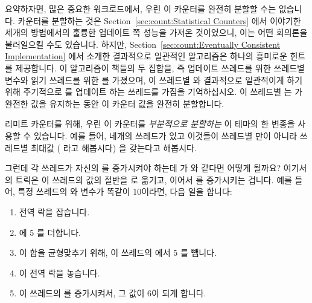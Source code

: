 \fi

요약하자면, 많은 중요한 워크로드에서, 우린 이 카운터를 완전히 분할할 수는
없습니다.
카운터를 분할하는 것은
Section~\ref{sec:count:Statistical Counters} 에서 이야기한 세개의 방법에서의
훌륭한 업데이트 쪽 성능을 가져온 것이었으니, 이는 어떤 회의론을 불러일으킬 수도
있습니다.
하지만,
Section~\ref{sec:count:Eventually Consistent Implementation}
에서 소개한 결과적으로 일관적인 알고리즘은 하나의 흥미로운 힌트를 제공합니다.
이 알고리즘이 책들의 두 집합을, 즉 업데이트 쓰레드를 위한 쓰레드별 
변수와 읽기 쓰레드를 위한  를 가졌으며, 이 쓰레드별
 와 결과적으로 일관적이게 하기 위해 주기적으로  를
업데이트 하는  쓰레드를 가짐을 기억하십시오.
이 쓰레드별  는  가 완전한 값을 유지하는 동안 이
카운터 값을 완전히 분할합니다.

리미트 카운터를 위해, 우린 이 카운터를 \emph{부분적으로 분할하는} 이 테마의 한
변종을 사용할 수 있습니다.
예를 들어, 네개의 쓰레드가 있고 이것들이 쓰레드별  만이 아니라
쓰레드별 최대값 ( 라고 해봅시다) 을 갖는다고 해봅시다.

그런데 각 쓰레드가 자신의  를 증가시켜야 하는데  가
 와 같다면 어떻게 될까요?
여기서의 트릭은 이 쓰레드의  값의 절반을  로
옮기고, 이어서  를 증가시키는 겁니다.
예를 들어, 특정 쓰레드의  와  변수가 똑같이
10이라면, 다음 일을 합니다:

\begin{enumerate}
\item	전역 락을 잡습니다.
\item	{} 에 5 를 더합니다.
\item	이 합을 균형맞추기 위해, 이 쓰레드의  에서 5 를 뺍니다.
\item	이 전역 락을 놓습니다.
\item	이 쓰레드의  를 증가시켜서, 그 값이 6이 되게 합니다.
\end{enumerate}


